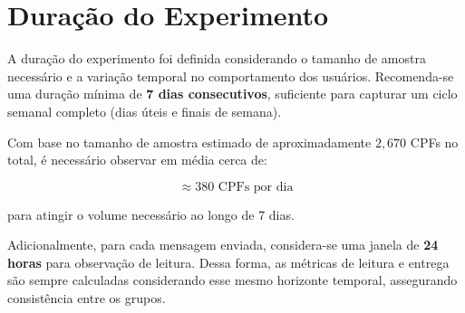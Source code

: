 

\section{Duração do Experimento}

A duração do experimento foi definida considerando o tamanho de amostra necessário e a variação temporal no comportamento dos usuários. Recomenda-se uma duração mínima de \textbf{7 dias consecutivos}, suficiente para capturar um ciclo semanal completo (dias úteis e finais de semana).

Com base no tamanho de amostra estimado de aproximadamente $2{,}670$ CPFs no total, é necessário observar em média cerca de:

\[
\approx 380 \text{ CPFs por dia}
\]

para atingir o volume necessário ao longo de 7 dias.

Adicionalmente, para cada mensagem enviada, considera-se uma janela de \textbf{24 horas} para observação de leitura. Dessa forma, as métricas de leitura e entrega são sempre calculadas considerando esse mesmo horizonte temporal, assegurando consistência entre os grupos.

